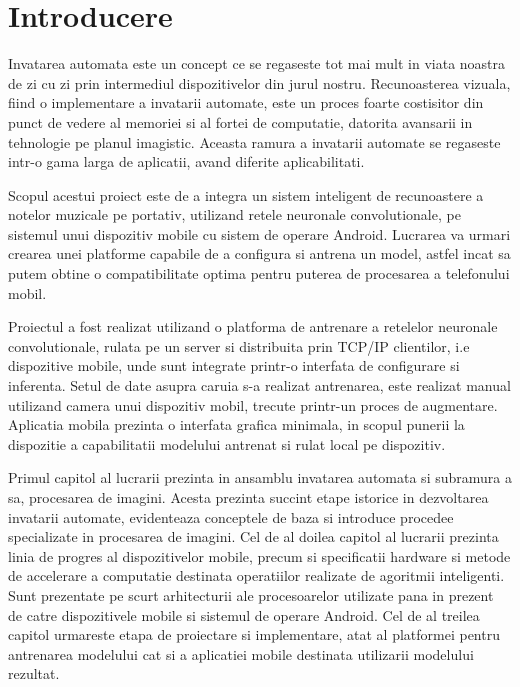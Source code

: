 \chapter{Introducere}

Invatarea automata este un concept ce se regaseste tot mai mult in viata noastra de zi cu zi prin intermediul dispozitivelor din jurul nostru. Recunoasterea vizuala, fiind o implementare a invatarii automate, este un proces foarte costisitor din punct de vedere al memoriei si al fortei de computatie, datorita avansarii in tehnologie pe planul imagistic. Aceasta ramura a invatarii automate se regaseste intr-o gama larga de aplicatii, avand diferite aplicabilitati.  \newline

Scopul acestui proiect este de a integra un sistem inteligent de recunoastere a notelor muzicale pe portativ, utilizand retele neuronale convolutionale, pe sistemul unui dispozitiv mobile cu sistem de operare Android. Lucrarea va urmari crearea unei platforme capabile de a configura si antrena un model, astfel incat sa putem obtine o compatibilitate optima pentru puterea de procesarea a telefonului mobil.\newline

Proiectul a fost realizat utilizand o platforma de antrenare a retelelor neuronale convolutionale, rulata pe un server si distribuita prin TCP/IP clientilor, i.e dispozitive mobile, unde sunt integrate printr-o interfata de configurare si inferenta. Setul de date asupra caruia s-a realizat antrenarea, este realizat manual utilizand camera unui dispozitiv mobil, trecute printr-un proces de augmentare. 
Aplicatia mobila prezinta o interfata grafica minimala, in scopul punerii la dispozitie a capabilitatii modelului antrenat si rulat local pe dispozitiv.\newline

Primul capitol al lucrarii prezinta in ansamblu invatarea automata si subramura a sa, procesarea de imagini. Acesta prezinta succint etape istorice in dezvoltarea invatarii automate, evidenteaza conceptele de baza si introduce procedee specializate in procesarea de imagini.
Cel de al doilea capitol al lucrarii prezinta linia de progres al dispozitivelor mobile, precum si specificatii hardware si metode de accelerare a computatie destinata operatiilor realizate de agoritmii inteligenti. Sunt prezentate pe scurt arhitecturii ale procesoarelor utilizate pana in prezent de catre dispozitivele mobile si sistemul de operare Android.
Cel de al treilea capitol urmareste etapa de proiectare si implementare, atat al platformei pentru antrenarea modelului cat si a aplicatiei mobile destinata utilizarii modelului rezultat.